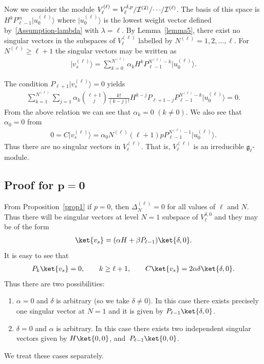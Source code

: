 \documentclass[pdftex]{sigma}
\numberwithin{equation}{section}
\begin{document}
Now we consider the module $ V^{(\ell)}_{\ell} = V^{\delta,p}_{\ell}/{\cal I}^{(2)}/ {\cdots } /{\cal I}^{(\ell)}$.
The basis of this space is $ H^k P_{\ell{-}1}^m \big|u_0^{(\ell)}\big\rangle  $ where $ \big|u_0^{(\ell)}\big\rangle  $ is the lowest weight
vector def\/ined by~\eqref{Assumption-lambda} with $ \lambda = \ell$.
By Lemma~\ref{lemma5}, there exist no singular vectors in the subspaces of $ V^{(\ell)}_{\ell} $ labelled by $
N^{(\ell)} = 1, 2, \dots, \ell$.
For $ N^{(\ell)} \geq \ell+1 $ the singular vectors may be written as
\begin{gather*}
\big|v_s^{(\ell)}\big\rangle  = \sum\limits_{k=0}^{N^{(\ell)}} \alpha_k H^k P_{\ell-1}^{N^{(\ell)}-k} \big|u_0^{(\ell)}\big\rangle .
\end{gather*}

The condition $ P_{\ell+1} \big|v_s^{(\ell)}\big\rangle  = 0 $ yields
\begin{gather*}
\sum\limits_{k=1}^{N^{(\ell)}} \sum\limits_{j=1} \alpha_k \binom{\ell+1}{j} \frac{k!}{(k-j)!} H^{k-j} P_{\ell+1-j}
P_{\ell-1}^{N^{(\ell)}-k} \big|u_0^{(\ell)}\big\rangle  = 0.
\end{gather*}
From the above relation we can see that $ \alpha_k = 0$ $(k \neq 0)$.
We also see that $ \alpha_0 = 0 $ from
\begin{gather*}
0 = C \big|v_s^{(\ell)}\big\rangle  = \alpha_0 N^{(\ell)} (\ell+1) p P_{\ell-1}^{N^{(\ell)}-1} \big|u_0^{(\ell)}\big\rangle .
\end{gather*}
Thus there are no singular vectors in $ V^{(\ell)}_{\ell}$.
That is, $ V^{(\ell)}_{\ell} $ is an irreducible ${\mathfrak g}_{\ell}$-module.

\subsection[Proof for $p=0$]{Proof for $\boldsymbol{p=0}$}

From Proposition~\ref{prop1} if $ p = 0 $, then $ \Delta^{(\ell)}_N = 0 $ for all values of $ \ell $ and $ N$.
Thus there will be singular vectors at level $ N = 1 $ subspace of $ V^{\delta,0}_{\ell} $ and they may be of the form
\begin{gather*}
\ket{v_s} = (\alpha H + \beta P_{\ell-1}) \ket{\delta,0}.
\end{gather*}
It is easy to see that
\begin{gather*}
P_k \ket{v_s} = 0, \qquad k \geq \ell+1,
\qquad
C \ket{v_s} = 2 \alpha \delta \ket{\delta,0}.
\end{gather*}
Thus there are two possibilities:
\begin{enumerate}\itemsep=0pt
\item[a)] $ \alpha = 0 $ and $ \delta $ is arbitrary (so we take $ \delta \neq 0$).
In this case there exists precisely one singular vector at $ N = 1 $ and it is given by $ P_{\ell-1} \ket{\delta,0}$.
\item[b)] $ \delta = 0 $ and $ \alpha $ is arbitrary.
In this case there exists two independent singular vectors given by $ H \ket{0,0}$, and~$P_{\ell-1} \ket{0,0}$.
\end{enumerate}
We treat these cases separately.
\end{document}
